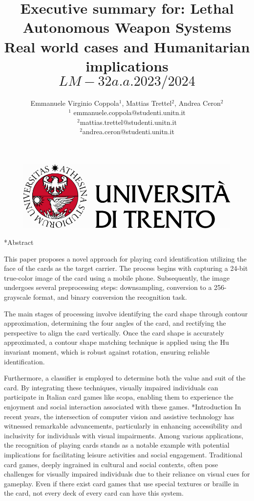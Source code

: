 \documentclass[twocolumn, a4paper,10pt]{article}
\title{%
Executive summary for: Lethal Autonomous 
Weapon Systems\\																								%
\vspace{4pt}
Real world cases and Humanitarian implications \[LM-32 a.a. 2023/2024\]
} 																																%
\author{																																														%
Emmanuele Virginio Coppola$^1$, Mattias Trettel$^2$, Andrea Ceron$^2$\\ 																										%
$^1$ emmanuele.coppola@studenti.unitn.it\\ 																																	%
$^2$mattias.trettel@studenti.unitn.it\\
$^2$andrea.ceron@studenti.unitn.it\\
\phantom{Line 9}} 																																									%
\date{\vspace{-0.5cm}}	%
\makeatletter
\renewcommand\section{\@startsection{section}{1}{\z@}{3pt}{3pt}{\normalfont\large\bfseries}}
\makeatother
\begin{document}
\maketitle
\begin{figure}
  \centering

\includegraphics[scale=0.6]{img/Logo.pdf} 																																	%
\end{figure}
\section*{Abstract}	%
\addtocounter{section}{1}

This paper proposes a novel approach for playing card identification utilizing the face of the cards as the target carrier. The process begins with capturing a 24-bit true-color image of the card using a mobile phone. Subsequently, the image undergoes several preprocessing steps: downsampling, conversion to a 256-grayscale format, and binary conversion the recognition task.

The main stages of processing involve identifying the card shape through contour approximation, determining the four angles of the card, and rectifying the perspective to align the card vertically. Once the card shape is accurately approximated, a contour shape matching technique is applied using the Hu invariant moment, which is robust against rotation, ensuring reliable identification.

Furthermore, a classifier is employed to determine both the value and suit of the card. By integrating these techniques, visually impaired individuals can participate in Italian card games like scopa, enabling them to experience the enjoyment and social interaction associated with these games.
\section*{Introduction}
In recent years, the intersection of computer vision and assistive technology has witnessed remarkable advancements, particularly in enhancing accessibility and inclusivity for individuals with visual impairments. Among various applications, the recognition of playing cards stands as a notable example with potential implications for facilitating leisure activities and social engagement. Traditional card games, deeply ingrained in cultural and social contexts, often pose challenges for visually impaired individuals due to their reliance on visual cues for gameplay. Even if there exist card games that use special textures or braille in the card, not every deck of every card can have this system.
\end{document}
